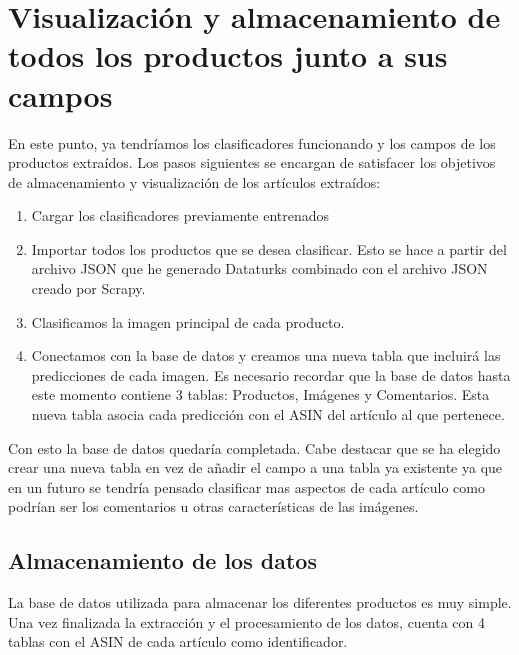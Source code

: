
\section{Visualización y almacenamiento de todos los productos junto a sus campos}

En este punto, ya tendríamos los clasificadores funcionando y los campos de los productos extraídos. Los pasos siguientes se encargan de satisfacer los objetivos de almacenamiento y visualización de los artículos extraídos:

\begin{enumerate}
    \item Cargar los clasificadores previamente entrenados
    \item Importar todos los productos que se desea clasificar. Esto se hace a partir del archivo JSON que he generado Dataturks combinado con el archivo JSON creado por Scrapy.
    \item Clasificamos la imagen  principal de cada producto.
    \item Conectamos con la base de datos y creamos una nueva tabla que incluirá las predicciones de cada imagen. Es necesario recordar que la base de datos hasta este momento contiene 3 tablas: Productos, Imágenes y Comentarios. Esta nueva tabla asocia cada predicción con el ASIN del artículo al que pertenece.
\end{enumerate}

Con esto la base de datos quedaría completada. Cabe destacar que se ha elegido crear una nueva tabla en vez de añadir el campo  a una tabla ya existente ya que en un futuro se tendría pensado clasificar mas aspectos de cada artículo como podrían ser los comentarios u otras características de las imágenes.

\subsection{Almacenamiento de los datos}

La base de datos utilizada para almacenar los diferentes productos es muy simple. Una vez finalizada la extracción y el procesamiento de los datos, cuenta con 4 tablas con el ASIN de cada artículo como identificador.


